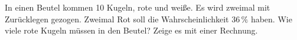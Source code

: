 \documentclass[11pt]{article}
\makeatletter
\newcommand{\aufg}[3]{\par\noindent\makebox[0pt][r]{#3}\begin{minipage}[t]{\linewidth}#1\end{minipage}\par}
\newcommand{\nr}[1]{\makebox[7mm][l]{\textbf{#1}}}
\newlength{\kr}
\newcommand{\karomerk}[2]{\protected@write\@auxout{}{\string\karoseite{#1}{#2}{\thepage}}}
\newcommand{\karoseite}[3]{\expandafter\xdef\csname karo@#1@#2\endcsname{#3}}
\makeatother
\begin{document}
\medskip
\aufg{\nr{5.}In einen Beutel kommen 10 Kugeln, rote und weiße. Es wird zweimal mit Zurücklegen gezogen. Zweimal Rot soll die Wahrscheinlichkeit $36\,\%$ haben. Wie viele rote Kugeln müssen in den Beutel? Zeige es mit einer Rechnung.}{}{{\scriptsize\color{mbgrau}Ziel\hspace{2mm}}}
\medskip
\par\vspace{3mm}\setlength{\kr}{\dimexpr\pagegoal-\pagetotal-10mm\relax}%
\ifdim\kr>12mm\karomerk{k}{T}\noindent{\scriptsize\color{mbgrau}Platz zum Rechnen}\par\nointerlineskip\vspace{1mm}\noindent
\begin{tikzpicture}\clip (0,0) rectangle ({\linewidth-0.5mm},\kr);\draw[black!16,line width=0.3pt,step=5mm] (0,0) grid (\linewidth,\kr);\end{tikzpicture}\fi\par
\end{document}

